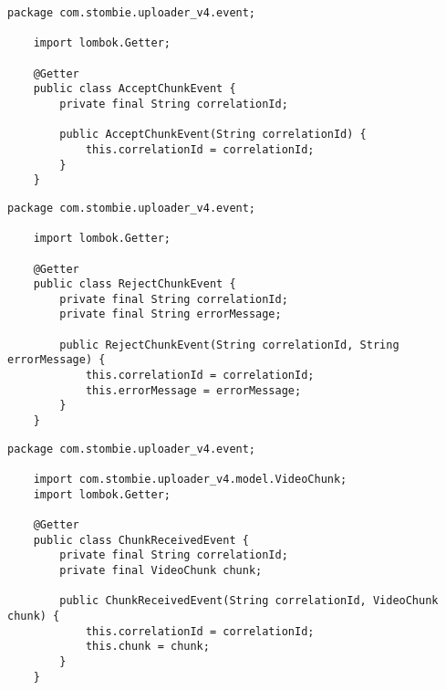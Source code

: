 \begin{lstlisting}[caption={AcceptChunkEvent.java}]
	package com.stombie.uploader_v4.event;
	
	import lombok.Getter;
	
	@Getter
	public class AcceptChunkEvent {
		private final String correlationId;
		
		public AcceptChunkEvent(String correlationId) {
			this.correlationId = correlationId;
		}
	}
\end{lstlisting}

\begin{lstlisting}[caption={RejectChunkEvent.java}]
	package com.stombie.uploader_v4.event;
	
	import lombok.Getter;
	
	@Getter
	public class RejectChunkEvent {
		private final String correlationId;
		private final String errorMessage;
		
		public RejectChunkEvent(String correlationId, String errorMessage) {
			this.correlationId = correlationId;
			this.errorMessage = errorMessage;
		}
	}
\end{lstlisting}


\begin{lstlisting}[caption={ChunkReceivedEvent.java}]
	package com.stombie.uploader_v4.event;
	
	import com.stombie.uploader_v4.model.VideoChunk;
	import lombok.Getter;
	
	@Getter
	public class ChunkReceivedEvent {
		private final String correlationId;
		private final VideoChunk chunk;
		
		public ChunkReceivedEvent(String correlationId, VideoChunk chunk) {
			this.correlationId = correlationId;
			this.chunk = chunk;
		}
	}
\end{lstlisting}

